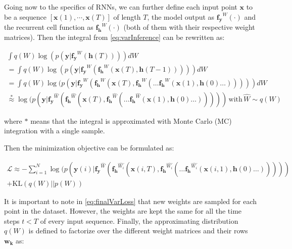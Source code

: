 Going now to the specifics of RNNs, we can further define each input point $\mathbf{x}$ to be a sequence $[\mathbf{x}(1),\cdots,\mathbf{x}(T)]$ of length $T$, the model output as $\mathbf{f_y}^W(\cdot)$ and the recurrent cell function as $\mathbf{f_h}^W(\cdot)$ (both of them with their respective weight matrices). Then the integral from \autoref{eq:varInference} can be rewritten as:

\begin{equation} \label{eq:approximation}
\begin{gathered}
	\int q(W) \log(p(\mathbf{y} | \mathbf{f_y}^W(\mathbf{h}(T))))dW \\ 
	= \int q(W) \log(p(\mathbf{y} | \mathbf{f_y}^W(\mathbf{f_h}^W(\mathbf{x}(T),\mathbf{h}(T-1)))))dW \\
	= \int q(W) \log(p(\mathbf{y} | \mathbf{f_y}^W(\mathbf{f_h}^W(\mathbf{x}(T),\mathbf{f_h}^W(\ldots\mathbf{f_h}^W(\mathbf{x}(1),\mathbf{h}(0)\ldots)))))dW \\
	\stackrel{*}{\approx} \log(p(\mathbf{y}| \mathbf{f_y}^{\hat{W}}(\mathbf{f_h}^{\hat{W}}(\mathbf{x}(T),\mathbf{f_h}^{\hat{W}}(\ldots\mathbf{f_h}^{\hat{W}}(\mathbf{x}(1),\mathbf{h}(0)\ldots))))) \, \text{with} \, \hat{W} \sim q(W)
\end{gathered}
\end{equation}

where $*$ means that the integral is approximated with Monte Carlo (MC) integration with a single sample.

Then the minimization objective can be formulated as:

\begin{equation} \label{eq:finalVarLoss}
\begin{gathered}
	\mathcal{L} \approx - \sum_{i=1}^{N} \log(p(\mathbf{y}(i) | \mathbf{f_y}^{\hat{W}}(\mathbf{f_h}^{\hat{W_i}}(\mathbf{x}(i,T),\mathbf{f_h}^{\hat{W_i}}(\ldots\mathbf{f_h}^{\hat{W_i}}(\mathbf{x}(i,1),\mathbf{h}(0)\ldots))))) \\ 
	+ \text{KL}(q(W)||p(W))
\end{gathered}
\end{equation}

It is important to note in \autoref{eq:finalVarLoss} that new weights are sampled for each point in the dataset. However, the weights are kept the same for all the time steps $t<T$ of every input sequence. Finally, the approximating distribution $q(W)$ is defined to factorize over the different weight matrices and their rows $\mathbf{w_k}$ as:

